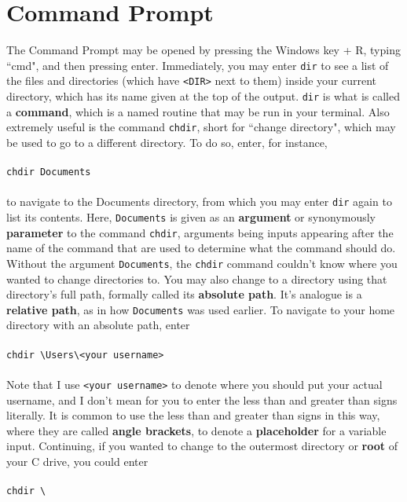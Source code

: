 \documentclass{article}
\begin{document}
\section*{Command Prompt}
The Command Prompt may be opened by pressing the Windows key + R, typing ``cmd", and then pressing enter. Immediately,
you may enter \verb|dir| to see a list of the files and directories (which have \verb|<DIR>| next to them) inside
your current directory, which has its name given at the top of the output. \verb|dir| is what is called a 
\textbf{command}, which is a named routine that may be run in your terminal. Also extremely useful is the command
\verb|chdir|, short for ``change directory", which may be used to go to a different directory. To do so, enter, for
instance, \\ \\
\verb|chdir Documents| \\ \\ to navigate to the Documents directory, from which you may enter \verb|dir| again
to list its contents. Here, \verb|Documents| is given as an \textbf{argument} or synonymously \textbf{parameter} to
the command \verb|chdir|, arguments being inputs appearing after the name of the command that are used to determine
what the command should do. Without the argument \verb|Documents|, the \verb|chdir| command couldn't know where you
wanted to change directories to. You may also change to a directory using that directory's full path, formally called
its \textbf{absolute path}. It's analogue is a \textbf{relative path}, as in how \verb|Documents| was used earlier.
To navigate to your home directory with an absolute path, enter \\ \\
\verb|chdir \Users\<your username>| \\ \\
Note that I use \verb|<your username>| to denote where you should put your actual username, and I don't mean for you
to enter the less than and greater than signs literally. It is common to use the less than and greater than signs
in this way, where they are called \textbf{angle brackets}, to denote a \textbf{placeholder} for a variable input. 
Continuing, if you wanted to change to the outermost directory or \textbf{root} of your C drive, you could enter
\\ \\
\verb|chdir \| \\ \\
\end{document}
